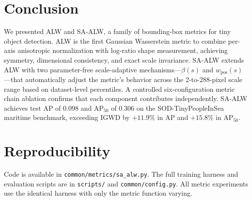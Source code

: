 \documentclass[runningheads]{llncs}
\begin{document}

\section{Conclusion}
\label{sec:conclusion}

We presented ALW and SA-ALW, a family of bounding-box metrics for tiny object
detection. ALW is the first Gaussian Wasserstein metric to combine per-axis
anisotropic normalization with log-ratio shape measurement, achieving
symmetry, dimensional consistency, and exact scale invariance. SA-ALW extends
ALW with two parameter-free scale-adaptive mechanisms---$\beta(s)$ and
$w_{\text{pos}}(s)$---that automatically adjust the metric's behavior across
the 2-to-288-pixel scale range based on dataset-level percentiles. A
controlled six-configuration metric chain ablation confirms that each
component contributes independently. SA-ALW achieves test AP of $0.098$
and AP$_{50}$ of $0.306$ on the SOD-TinyPeopleInSea maritime benchmark,
exceeding IGWD by $+11.9\%$ in AP and $+15.8\%$ in AP$_{50}$.

\section*{Reproducibility}

Code is available in \texttt{common/metrics/sa\_alw.py}. The full training
harness and evaluation scripts are in \texttt{scripts/} and
\texttt{common/config.py}. All metric experiments use the identical harness
with only the metric function varying.



\end{document}
